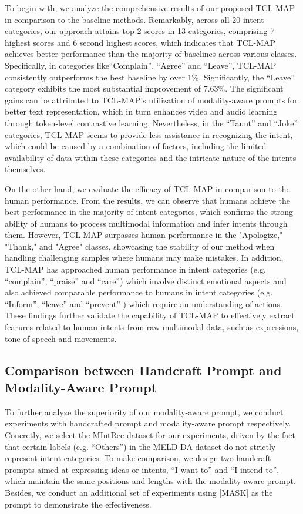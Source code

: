 \documentclass[letterpaper]{article} %
\begin{document}
To begin with, we analyze the comprehensive results of our proposed TCL-MAP in comparison to the baseline methods. Remarkably, across all 20 intent categories, our approach attains top-2 scores in 13 categories, comprising 7 highest scores and 6 second highest scores, which indicates that  TCL-MAP achieves better performance than the majority of baselines across various classes. Specifically, in categories like``Complain'', ``Agree'' and ``Leave'', TCL-MAP consistently outperforms the best baseline by over 1\%. Significantly, the ``Leave'' category exhibits the most substantial improvement of 7.63\%. The significant gains can be attributed to TCL-MAP's utilization of modality-aware prompts for better text representation, which in turn enhances video and audio learning through token-level contrastive learning. Nevertheless, in the ``Taunt'' and ``Joke'' categories, TCL-MAP seems to provide less assistance in recognizing the intent, which could be caused by a combination of factors, including the limited availability of data within these categories and the intricate nature of the intents themselves.

On the other hand, we evaluate the efficacy of TCL-MAP in comparison to the human performance. From the results, we can observe that humans achieve the best performance in the majority of intent categories, which confirms the strong ability of humans to process multimodal information and infer intents through them. However, TCL-MAP surpasses human performance in the "Apologize," "Thank," and "Agree" classes, showcasing the stability of our method when handling challenging samples where humans may make mistakes. In addition, TCL-MAP has approached human performance in intent categories (e.g. ``complain'', ``praise'' and ``care'') which involve distinct emotional aspects and also achieved comparable performance to humans in intent categories (e.g. ``Inform'', ``leave'' and ``prevent'' ) which require an understanding of actions. These findings further validate the capability of TCL-MAP to effectively extract fearures related to human intents from raw multimodal data, such as expressions, tone of speech and movements.


\vspace{-2.03mm}
\subsection{Comparison between Handcraft Prompt and Modality-Aware Prompt}
To further analyze the superiority of our modality-aware prompt, we conduct experiments with handcrafted prompt and modality-aware prompt respectively. Concretly, we select the MIntRec dataset for our experiments, driven by the fact that certain labels (e.g. ``Others'') in the MELD-DA dataset do not strictly represent intent categories. To make comparison, we design two handcraft prompts aimed at expressing ideas or intents, ``I want to'' and ``I intend to'', which maintain the same positions and lengths with the modality-aware prompt. Besides, we conduct an additional set of experiments using [MASK] as the prompt to demonstrate the effectiveness.
\end{document}
